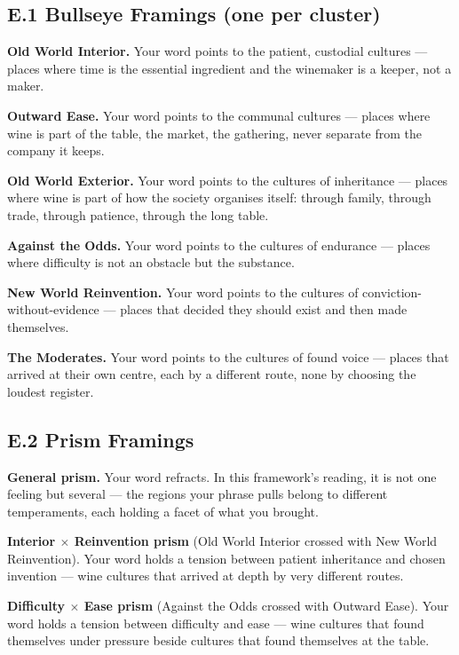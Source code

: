 \documentclass[11pt]{article}
\begin{document}
\subsection*{E.1 Bullseye Framings (one per cluster)}

\textbf{Old World Interior.} Your word points to the patient, custodial cultures --- places where time is the essential ingredient and the winemaker is a keeper, not a maker.

\textbf{Outward Ease.} Your word points to the communal cultures --- places where wine is part of the table, the market, the gathering, never separate from the company it keeps.

\textbf{Old World Exterior.} Your word points to the cultures of inheritance --- places where wine is part of how the society organises itself: through family, through trade, through patience, through the long table.

\textbf{Against the Odds.} Your word points to the cultures of endurance --- places where difficulty is not an obstacle but the substance.

\textbf{New World Reinvention.} Your word points to the cultures of conviction-without-evidence --- places that decided they should exist and then made themselves.

\textbf{The Moderates.} Your word points to the cultures of found voice --- places that arrived at their own centre, each by a different route, none by choosing the loudest register.

\subsection*{E.2 Prism Framings}

\textbf{General prism.} Your word refracts. In this framework's reading, it is not one feeling but several --- the regions your phrase pulls belong to different temperaments, each holding a facet of what you brought.

\textbf{Interior $\times$ Reinvention prism} (Old World Interior crossed with New World Reinvention). Your word holds a tension between patient inheritance and chosen invention --- wine cultures that arrived at depth by very different routes.

\textbf{Difficulty $\times$ Ease prism} (Against the Odds crossed with Outward Ease). Your word holds a tension between difficulty and ease --- wine cultures that found themselves under pressure beside cultures that found themselves at the table.
\end{document}

